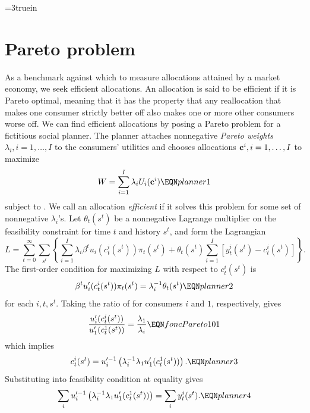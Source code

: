 \centerline{\epsfxsize=3truein} \caption{The
commodity space with Arrow securities.  At date $t=2$, there are
trades in time $3$ goods for only those time $t=3$ nodes that can
be reached from the realized time $t=2$ history $(0,0, 1)$.}
\endfigure

\section{Pareto problem}
As a benchmark against which to measure allocations attained by a
market  economy, we seek efficient allocations. An allocation is
said to be efficient if it is Pareto optimal, meaning that  it has the property
that any reallocation  that makes one consumer strictly better
off also makes one or more other consumers worse off. We can find
efficient allocations by posing a Pareto problem for a fictitious
social planner. The  planner attaches nonnegative {\it Pareto
weights\/} $\lambda_i, i=1, \ldots, I$ to the consumers' utilities and
chooses allocations ${\bf c}^i, i=1, \ldots, I$ to maximize
$$ W = \sum_{i=1}^I \lambda_i U_i({\bf c}^i)  \EQN planner1  $$
subject to .
We call an allocation {\it efficient\/}
if it solves this problem for some set of
nonnegative $\lambda_i$'s.
Let $\theta_t(s^t)$ be a nonnegative Lagrange multiplier on the
feasibility constraint 
for time  $t$ and  history  $s^t$,  and form
the Lagrangian
$$ L =
 \sum_{t=0}^\infty \sum_{s^t}
   \left\{  \sum_{i=1}^I \lambda_i \beta^t u_i(c_t^i(s^t)) \pi_t(s^t)
     + \theta_t(s^t) \sum_{i=1}^I [ y_t^i(s^t) - c_t^i(s^t) ]  \right\} . $$
The first-order condition for maximizing $L$
with respect to $c_t^i(s^t)$ is
$$ \beta^t u'_i(c_t^i(s^t))\pi_t(s^t) = \lambda_i^{-1}  \theta_t(s^t)
\EQN planner2 $$
for each $i, t, s^t$.  Taking the ratio of  for  consumers
$i$ and $1$, respectively,
gives
$$ {u'_i(c^i_t(s^t)) \over u'_1(c^1_t(s^t))} = {\lambda_1  \over \lambda_i}  \EQN foncPareto101 $$
which implies
$$ c_t^i(s^t) = u^{\prime -1}_i
    \left(\lambda_i^{-1} \lambda_1 u'_1(c_t^1(s^t)) \right). \EQN planner3
$$
Substituting  into feasibility condition  at
equality gives
$$ \sum_i u^{\prime -1}_i
    \left(\lambda_i^{-1} \lambda_1 u'_1(c_t^1(s^t)) \right)
  = \sum_i y_t^i(s^t)  . \EQN planner4 $$
